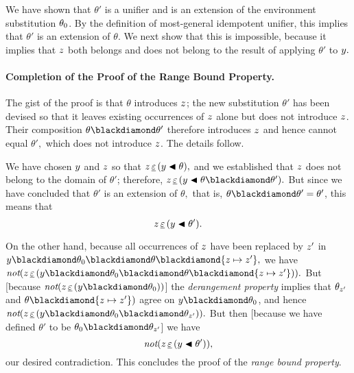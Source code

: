 \documentclass[runningheads]{llncs}
\DeclareMathOperator{\unot}{\emph{not}\kern-.0pt}
\begin{document}
We have shown that $\theta'$ is a unifier and is an extension of the environment substitution  $\theta_{0}$. By the definition of most-general idempotent unifier, this implies that $\theta'$ is an extension of $\theta.$ We next show that this is impossible, because it implies that $z$ both belongs and does not belong to the result of applying $\theta'$ to $y.$

\paragraph{Completion of the Proof of the Range Bound Property.} 
The gist of the proof is that $\theta$ introduces $z$; 
the new substitution $\theta'$ has been devised so that it leaves existing occurrences of $z$ alone but does not introduce $z$.  
Their composition $\theta \compose \theta'$ therefore introduces $z$ and hence cannot equal $\theta',$ which does not introduce $z$. The details follow.

We have chosen $y$ and $z$ so that $z \, \underline{\varepsilon} \, (y \blacktriangleleft \theta),$  and we established that $z$ does not belong to the domain of $\theta'$; therefore,
$\var{z} \occurseq (\var{y} \apply \theta \compose \theta').$  But since we have concluded that $\theta'$ is an extension of $\theta,$  that is, $\theta \compose \theta' = \theta'$, this means that
\[z \, \underline{\varepsilon} \, (y \blacktriangleleft \theta').\]




On the other hand, because all occurrences of $z$ have been replaced by $z'$ in $\var{y} \compose \thet{0} \compose \theta \compose \{\var{z} \mapsto \var{z'}\},$ we have $\unot(\var{z} \occurseq (\var{y} \compose \thet{0} \compose \theta \compose \{\var{z} \mapsto \var{z'}\})).$  But [because $\unot(\var{z} \occurseq (\var{y} \compose \thet{0}))$] the \emph{derangement property} implies that $\theta_{z'}$ and $\theta \compose \{\var{z} \mapsto \var{z'}\})$ agree on $\var{y} \compose \thet{0}$, and hence
$\unot(\var{z} \occurseq (\var{y} \compose \thet{0} \compose \thet{z'})).$ But then [because we have defined $\theta'$ to be $\thet{0}\compose \thet{z'}$] we have 
\[\unot(\var{z} \occurseq (\var{y} \apply \theta')),\]
our desired contradiction.  This concludes the proof of the \emph{range bound property}.
\end{document}
